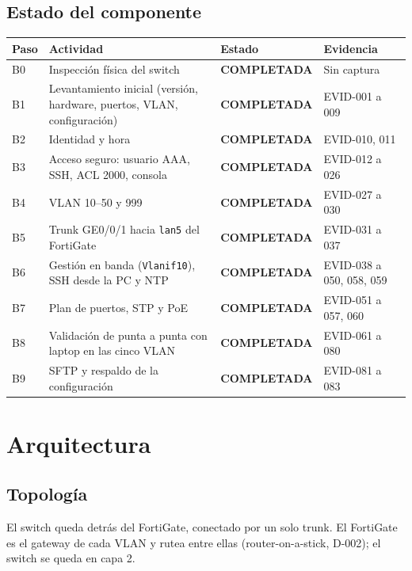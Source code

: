 \documentclass[11pt,a4paper]{article}
\newcommand{\estado}[1]{%
  \ifstrequal{#1}{COMPLETADA}{\textcolor{okgreen}{\textbf{\footnotesize #1}}}{%
  \ifstrequal{#1}{OPERATIVO VALIDADO}{\textcolor{okgreen}{\textbf{\footnotesize #1}}}{%
  \ifstrequal{#1}{OK}{\textcolor{okgreen}{\textbf{\footnotesize #1}}}{%
  \ifstrequal{#1}{RESUELTO}{\textcolor{okgreen}{\textbf{\footnotesize #1}}}{%
  \ifstrequal{#1}{EN CURSO}{\textcolor{amber}{\textbf{\footnotesize #1}}}{%
  \ifstrequal{#1}{REPORTADO}{\textcolor{amber}{\textbf{\footnotesize #1}}}{%
  \ifstrequal{#1}{NO EJECUTADA}{\textcolor{muted}{\textbf{\footnotesize #1}}}{%
  \ifstrequal{#1}{PROPUESTO}{\textcolor{violet}{\textbf{\footnotesize #1}}}{%
  \ifstrequal{#1}{PENDIENTE}{\textcolor{alertred}{\textbf{\footnotesize #1}}}{%
  \textbf{\footnotesize #1}}}}}}}}}}}
\newcommand{\cab}{\rowcolor{light}}
\begin{document}
\subsection{Estado del componente}
\begin{tabularx}{\textwidth}{L{1.2cm} Z L{3.1cm} L{2.3cm}}
  \toprule
  \cab\textbf{Paso} & \textbf{Actividad} & \textbf{Estado} & \textbf{Evidencia}\\
  \midrule
  B0 & Inspección física del switch & \estado{COMPLETADA} & Sin captura\\
  B1 & Levantamiento inicial (versión, hardware, puertos, VLAN, configuración) & \estado{COMPLETADA} & EVID-001 a 009\\
  B2 & Identidad y hora & \estado{COMPLETADA} & EVID-010, 011\\
  B3 & Acceso seguro: usuario AAA, SSH, ACL 2000, consola & \estado{COMPLETADA} & EVID-012 a 026\\
  B4 & VLAN 10--50 y 999 & \estado{COMPLETADA} & EVID-027 a 030\\
  B5 & Trunk GE0/0/1 hacia \texttt{lan5} del FortiGate & \estado{COMPLETADA} & EVID-031 a 037\\
  B6 & Gestión en banda (\texttt{Vlanif10}), SSH desde la PC y NTP & \estado{COMPLETADA} & EVID-038 a 050, 058, 059\\
  B7 & Plan de puertos, STP y PoE & \estado{COMPLETADA} & EVID-051 a 057, 060\\
  B8 & Validación de punta a punta con laptop en las cinco VLAN & \estado{COMPLETADA} & EVID-061 a 080\\
  B9 & SFTP y respaldo de la configuración & \estado{COMPLETADA} & EVID-081 a 083\\
  \bottomrule
\end{tabularx}

\section{Arquitectura}
\subsection{Topología}
El switch queda detrás del FortiGate, conectado por un solo trunk. El FortiGate es el gateway de cada VLAN y rutea entre ellas (router-on-a-stick, D-002); el switch se queda en capa 2.
\end{document}
